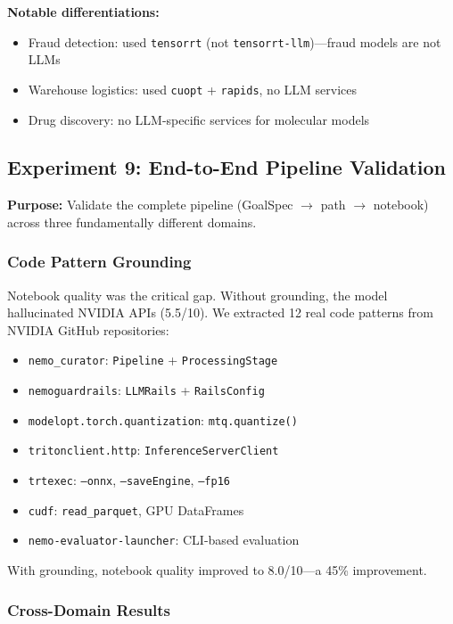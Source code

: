 \documentclass[conference]{IEEEtran}
\begin{document}
\textbf{Notable differentiations:}
\begin{itemize}
    \item Fraud detection: used \texttt{tensorrt} (not \texttt{tensorrt-llm})---fraud models are not LLMs
    \item Warehouse logistics: used \texttt{cuopt} + \texttt{rapids}, no LLM services
    \item Drug discovery: no LLM-specific services for molecular models
\end{itemize}

\subsection{Experiment 9: End-to-End Pipeline Validation}

\textbf{Purpose:} Validate the complete pipeline (GoalSpec $\rightarrow$ path $\rightarrow$ notebook) across three fundamentally different domains.

\subsubsection{Code Pattern Grounding}

Notebook quality was the critical gap. Without grounding, the model hallucinated NVIDIA APIs (5.5/10). We extracted 12 real code patterns from NVIDIA GitHub repositories:

\begin{itemize}
    \item \texttt{nemo\_curator}: \texttt{Pipeline} + \texttt{ProcessingStage}
    \item \texttt{nemoguardrails}: \texttt{LLMRails} + \texttt{RailsConfig}
    \item \texttt{modelopt.torch.quantization}: \texttt{mtq.quantize()}
    \item \texttt{tritonclient.http}: \texttt{InferenceServerClient}
    \item \texttt{trtexec}: \texttt{--onnx}, \texttt{--saveEngine}, \texttt{--fp16}
    \item \texttt{cudf}: \texttt{read\_parquet}, GPU DataFrames
    \item \texttt{nemo-evaluator-launcher}: CLI-based evaluation
\end{itemize}

With grounding, notebook quality improved to 8.0/10---a 45\% improvement.

\subsubsection{Cross-Domain Results}
\end{document}
